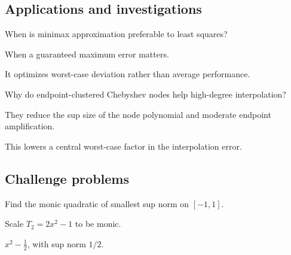 \subsection*{Applications and investigations}

\begin{exercise}\label{exr:ii22-expand-13}
When is minimax approximation preferable to least squares?
\end{exercise}
\begin{hint}
When a guaranteed maximum error matters.
\end{hint}
\begin{solution}
It optimizes worst-case deviation rather than average performance.
\end{solution}

\begin{exercise}\label{exr:ii22-expand-14}
Why do endpoint-clustered Chebyshev nodes help high-degree interpolation?
\end{exercise}
\begin{hint}
They reduce the sup size of the node polynomial and moderate endpoint amplification.
\end{hint}
\begin{solution}
This lowers a central worst-case factor in the interpolation error.
\end{solution}

\subsection*{Challenge problems}

\begin{exercise}\label{exr:ii22-expand-15}
Find the monic quadratic of smallest sup norm on \([-1,1]\).
\end{exercise}
\begin{hint}
Scale \(T_2=2x^2-1\) to be monic.
\end{hint}
\begin{solution}
\(x^2-\frac12\), with sup norm \(1/2\).
\end{solution}

